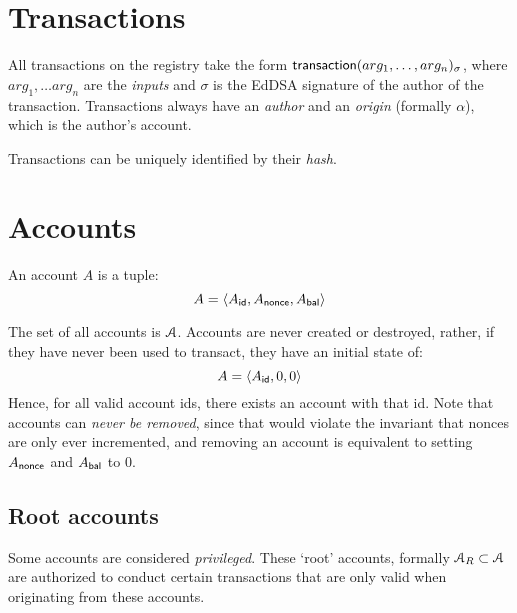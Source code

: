 \section{Transactions}
\label{s:transactions}

All transactions on the registry take the form $\operatorname{\mathsf{transaction}}\lparen arg_1, \ldots,
arg_n\rparen_\sigma$, where $arg_1, \ldots arg_n$ are the \emph{inputs} and $\sigma$ is the
\textsf{EdDSA} signature of the author of the transaction. Transactions always
have an \emph{author} and an \emph{origin} (formally $\alpha$), which is the
author's account.

Transactions can be uniquely identified by their \emph{hash}.

\section{Accounts}
An account $A$ is a tuple:
\[
    A = \langle A_{\mathsf{id}}, A_{\mathsf{nonce}}, A_{\mathsf{bal}}\rangle
\]

The set of all accounts is $\mathcal{A}$. Accounts are never created or destroyed,
rather, if they have never been used to transact, they have an initial state of:
\[
    A = \langle A_{\mathsf{id}}, 0, 0\rangle
\]
Hence, for all valid account ids, there exists an account with that id. Note that
accounts can \emph{never be removed}, since that would violate the invariant that
nonces are only ever incremented, and removing an account is equivalent to setting
$A_{\mathsf{nonce}}$ and $A_{\mathsf{bal}}$ to $0$.

\subsection{Root accounts}
Some accounts are considered \emph{privileged}. These `root' accounts,
formally $\mathcal{A}_R \subset \mathcal{A}$ are authorized to conduct certain transactions
that are only valid when originating from these accounts.

